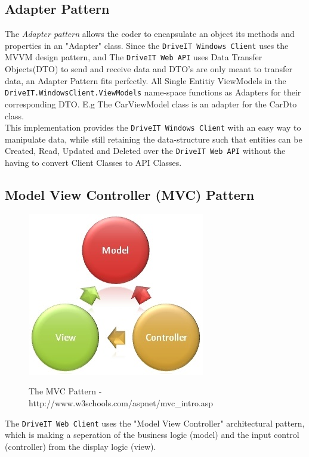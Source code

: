 \subsection{Adapter Pattern}
The \textit{Adapter pattern} allows the coder to encapsulate an object its methods and properties in an "Adapter" class. Since the \texttt{DriveIT Windows Client} uses the MVVM design pattern, and The \texttt{DriveIT Web API} uses Data Transfer Objects(DTO) to send and receive data and DTO's are only meant to transfer data, an Adapter Pattern fits perfectly. All Single Entitiy ViewModels in the \texttt{DriveIT.WindowsClient.ViewModels} name-space functions as Adapters for their corresponding DTO. E.g The CarViewModel class is an adapter for the CarDto class.\\ 

This implementation provides the \texttt{DriveIT Windows Client} with an easy way to manipulate data, while still retaining the data-structure such that entities can be Created, Read, Updated and Deleted over the \texttt{DriveIT Web API} without the having to convert Client Classes to API Classes.

\subsection{Model View Controller (MVC) Pattern}
\label{sec:MVC}
\begin{figure}[H]
	\centering
	\includegraphics[scale=0.6]{Figures/WebImages/MVCPattern}\\
	\caption{The MVC Pattern - http://www.w3schools.com/aspnet/mvc_intro.asp}
	\label{fig:MVCPattern}
\end{figure}
The \texttt{DriveIT Web Client} uses the "Model View Controller" architectural pattern, which is making a seperation of the business logic (model) and the input control (controller) from the display logic (view).

